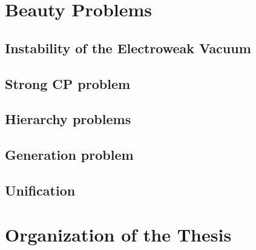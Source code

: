 \section{Beauty Problems}

\subsection{Instability of the Electroweak Vacuum}

\subsection{Strong CP problem}

\subsection{Hierarchy problems}

\subsection{Generation problem}

\subsection{Unification}

\section{Organization of the Thesis}

